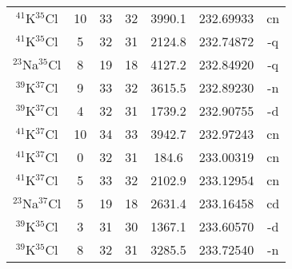 \begin{table*}[htp]
\begin{tabular}{ccccccc}
$^{41}$K$^{35}$Cl & 10 & 33 & 32 & 3990.1 & 232.69933 & cn \\
$^{41}$K$^{35}$Cl & 5 & 32 & 31 & 2124.8 & 232.74872 & -q \\
$^{23}$Na$^{35}$Cl & 8 & 19 & 18 & 4127.2 & 232.84920 & -q \\
$^{39}$K$^{37}$Cl & 9 & 33 & 32 & 3615.5 & 232.89230 & -n \\
$^{39}$K$^{37}$Cl & 4 & 32 & 31 & 1739.2 & 232.90755 & -d \\
$^{41}$K$^{37}$Cl & 10 & 34 & 33 & 3942.7 & 232.97243 & cn \\
$^{41}$K$^{37}$Cl & 0 & 32 & 31 & 184.6 & 233.00319 & cn \\
$^{41}$K$^{37}$Cl & 5 & 33 & 32 & 2102.9 & 233.12954 & cn \\
$^{23}$Na$^{37}$Cl & 5 & 19 & 18 & 2631.4 & 233.16458 & cd \\
$^{39}$K$^{35}$Cl & 3 & 31 & 30 & 1367.1 & 233.60570 & -d \\
$^{39}$K$^{35}$Cl & 8 & 32 & 31 & 3285.5 & 233.72540 & -n \\
\hline
\end{tabular}

\par 
\end{table*}
